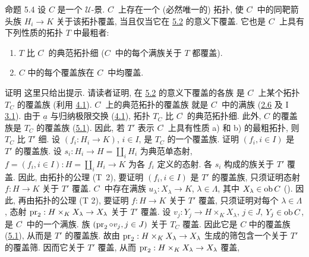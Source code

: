 \begin{enonce*}{命题 5.4}
设 $C$ 是一个 $𝒰$-景.
$C^{\widehat{\phantom{,}}}$ 上存在一个 (必然唯一的) 拓扑,
使 $C^{\widehat{\phantom{,}}}$ 中的同靶箭头族
$H_i\rightarrow K$ 关于该拓扑覆盖,
当且仅当它在 \hyperref[II.def5.2]{5.2} 的意义下覆盖.
它也是 $C^{\widehat{\phantom{,}}}$ 上具有下列性质的拓扑 $T$ 中最粗者:
\begin{enumerate}
\renewcommand{\theenumi}{\alph{enumi}}
\renewcommand{\labelenumi}{\theenumi)}
\item $T$ 比 $C^{\widehat{\phantom{,}}}$ 的典范拓扑细
(\ie $C^{\widehat{\phantom{,}}}$ 中的每个满族关于 $T$ 都覆盖).

\item $C$ 中的每个覆盖族在 $C^{\widehat{\phantom{,}}}$ 中均覆盖.
\end{enumerate}
\end{enonce*}

\begin{enonce*}[remark]{证明}
这里只给出提示.
请读者证明, 在 \hyperref[II.def5.2]{5.2} 的意义下覆盖的各族
是 $C^{\widehat{\phantom{,}}}$ 上某个拓扑 $T_C$ 的覆盖族
(利用 \hyperref[II.theo4.1]{4.1}).
$C^{\widehat{\phantom{,}}}$ 上的典范拓扑的覆盖族
就是 $C^{\widehat{\phantom{,}}}$ 中的满族
(\hyperref[II.prop2.6]{2.6} 及 I \hyperref[I.prop3.1]{3.1}).
由于 $\underline{a}$ 与归纳极限交换
(\hyperref[II.theo4.1]{4.1}),
拓扑 $T_C$ 比 $C^{\widehat{\phantom{,}}}$ 的典范拓扑细.
此外, $C$ 的覆盖族是 $T_C$ 的覆盖族 (\hyperref[II.prop5.1]{5.1}).
因此, 若 $T'$ 表示 $C^{\widehat{\phantom{,}}}$ 上具有性质 a) 和 b) 的最粗拓扑,
则 $T_C$ 比 $T'$ 细.
设 $(f_i:H_i\rightarrow K)$, $i\in I$, 是\pageoriginale{} $T_C$ 的一个覆盖族.
证明 $(f_i,i\in I)$ 是 $T'$ 的覆盖族.
设 $s_i:H_i\rightarrow H=\amalg_i H_i$ 为典范单态射,
$f=(f_i,i\in I):H=\amalg_i H_i\rightarrow K$
为各 $f_i$ 定义的态射.
各 $s_i$ 构成的族关于 $T'$ 覆盖.
因此, 由拓扑的公理 (T~2),
要证明 $(f_i,i\in I)$ 是 $T'$ 的覆盖族,
只须证明态射 $f:H\rightarrow K$ 关于 $T'$ 覆盖.
$C^{\widehat{\phantom{,}}}$ 中存在满族
$u_{\lambda}:X_{\lambda}\rightarrow K$, $\lambda\in \Lambda$,
其中 $X_{\lambda}\in \operatorname{ob} C$ ().
因此, 再由拓扑的公理 (T 2),
要证明 $f:H\rightarrow K$ 关于 $T'$ 覆盖,
只须证明对每个 $\lambda\in \Lambda$,
态射 $\operatorname{pr}_2:H\times_K X_{\lambda}\rightarrow X_{\lambda}$ 关于 $T'$ 覆盖.
设 $v_j:Y_j\rightarrow H\times_K X_{\lambda}$, $j\in J$,
$Y_j\in \operatorname{ob} C$, 是 $C^{\widehat{\phantom{,}}}$ 中的一个满族.
族 $(\operatorname{pr}_2\circ v_j,j\in J)$ 关于 $T_C$ 覆盖.
因此它是 $C$ 中的覆盖族 (\hyperref[II.prop5.1]{5.1}),
从而是 $T'$ 的覆盖族.
故由 $\operatorname{pr}_2:H\times_K X_{\lambda}\rightarrow X_{\lambda}$
生成的筛包含一个关于 $T'$ 的覆盖筛.
因而它关于 $T'$ 覆盖,
从而 $\operatorname{pr}_2:H\times_K X_{\lambda}\rightarrow X_{\lambda}$ 覆盖, \cqfd
\end{enonce*}

